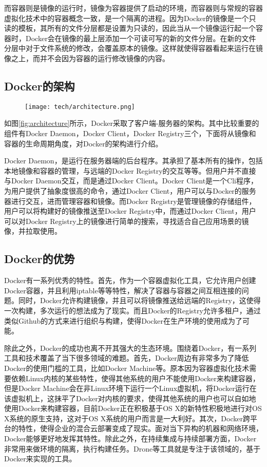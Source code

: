 而容器则是镜像的运行时，镜像为容器提供了启动的环境，而容器则与常规的容器虚拟化技术中的容器概念一致，是一个隔离的进程。因为Docker的镜像是一个只读的模板，其所有的文件分层都是设置为只读的，因此当从一个镜像运行起一个容器时，Docker会在镜像的最上层添加一个可读可写的新的文件分层。在新的文件分层中对于文件系统的修改，会覆盖原本的镜像。这样就使得容器看起来运行在镜像之上，而并不会因为容器的运行修改镜像的内容。

\subsection{Docker的架构}

\begin{figure}[!htp]
  \centering
  \texttt{[image: tech/architecture.png]}
\end{figure}

如图\ref{fig:architecture}所示，Docker采取了客户端-服务器的架构。其中比较重要的组件有Docker Daemon，Docker Client，Docker Registry三个，下面将从镜像和容器的生命周期角度，对Docker的架构进行介绍。

Docker Daemon，是运行在服务器端的后台程序。其承担了基本所有的操作，包括本地镜像和容器的管理，与远端的Docker Registry的交互等等。但用户并不直接与Docker Daemon交互，而是通过Docker Client。Docker Client是一个Cli程序，为用户提供了抽象度很高的命令，通过Docker Client，用户可以与Docker的服务器进行交互，进而管理容器和镜像。而Docker Registry是管理镜像的存储组件，用户可以将构建好的镜像推送至Docker Registry中，而通过Docker Client，用户可以对Docker Registry上的镜像进行简单的搜索，寻找适合自己应用场景的镜像，并拉取使用。

\subsection{Docker的优势}

Docker有一系列优秀的特性。首先，作为一个容器虚拟化工具，它允许用户创建Docker容器，并且利用iptable等等特性，解决了容器与容器之间互相连接的问题。同时，Docker允许构建镜像，并且可以将镜像推送给远端的Registry，这使得一次构建，多次运行的想法成为了现实。而且Docker的Registry允许多租户，通过类似Github的方式来进行组织与构建，使得Docker在生产环境的使用成为了可能。

除此之外，Docker的成功也离不开其强大的生态环境。围绕着Docker，有一系列工具和技术覆盖了当下很多领域的难题。首先，Docker周边有非常多为了降低Docker的使用门槛的工具，比如Docker Machine等。原本因为容器虚拟化技术需要依赖Linux内核的某些特性，使得其他系统的用户不能使用Docker来构建容器，但是Docker Machine会在非Linux环境下运行一个Linux虚拟机，将Docker运行在该虚拟机上，这抹平了Docker对内核的要求，使得其他系统的用户也可以自如地使用Docker来构建容器，目前Docker正在积极基于OS X的新特性积极地进行对OS X系统的原生支持，这对于OS X系统的用户而言是一大利好。其次，Docker跨平台的特性，使得企业的混合云部署变成了现实。面对当下异构的机器和网络环境，Docker能够更好地发挥其特性。除此之外，在持续集成与持续部署方面，Docker非常用来做环境的隔离，执行构建任务。Drone等工具就是专注于该领域的，基于Docker来实现的工具。
